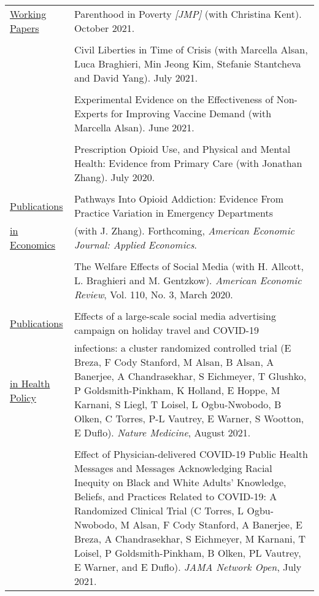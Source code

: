 \documentclass[letterpaper,11pt]{article}
\begin{document}
\begin{footnotesize}
{  \begin{tabularx}{\linewidth}{@{}
    >{\raggedright\arraybackslash\hsize=0.266\hsize}X 
    >{\raggedright\arraybackslash\hsize=1.733\hsize}X
  }
          \underline{Working Papers}  & Parenthood in Poverty \textit{[JMP]} (with Christina Kent). October 2021. \\
        & \\
        & Civil Liberties in Time of Crisis (with Marcella Alsan, Luca Braghieri, Min Jeong Kim, Stefanie Stantcheva and David Yang). July 2021. \\
        & \\
& Experimental Evidence on the Effectiveness of Non-Experts for Improving Vaccine Demand (with Marcella Alsan). June 2021. \\
& \\
& Prescription Opioid Use, and Physical and Mental Health: Evidence from Primary Care (with Jonathan Zhang). July 2020.   \\
& \\
        \underline{Publications}   & Pathways Into Opioid Addiction: Evidence From Practice Variation in Emergency Departments \\ 
        \underline{in Economics}  & (with J. Zhang). Forthcoming, \textit{American Economic Journal: Applied Economics}.   \\
        &  \\
        & The Welfare Effects of Social Media (with H. Allcott, L. Braghieri and M. Gentzkow). \textit{American Economic Review}, Vol. 110, No. 3, March 2020.  \\
        &  \\
 \underline{Publications}         & Effects of a large-scale social media advertising campaign on holiday travel and COVID-19 \\
 \underline{in Health Policy} &  infections: a cluster randomized controlled trial (E Breza, F Cody Stanford, M Alsan, B Alsan, A Banerjee, A Chandrasekhar, S Eichmeyer, T Glushko, P Goldsmith-Pinkham, K Holland, E Hoppe, M Karnani, S Liegl, T Loisel, L Ogbu-Nwobodo, B Olken, C Torres, P-L Vautrey, E Warner, S Wootton, E Duflo).  \textit{Nature Medicine}, August 2021.  \\
        &  \\
       & Effect of Physician-delivered COVID-19 Public Health Messages and Messages Acknowledging Racial Inequity on Black and White Adults' Knowledge, Beliefs, and Practices Related to COVID-19: A Randomized Clinical Trial (C Torres, L Ogbu-Nwobodo, M Alsan, F Cody Stanford, A Banerjee, E Breza, A Chandrasekhar, S Eichmeyer, M Karnani, T Loisel, P Goldsmith-Pinkham, B Olken, PL Vautrey, E Warner, and E Duflo).   \textit{JAMA Network Open}, July 2021.  \\

\end{tabularx}}
\end{footnotesize}
\end{document}
